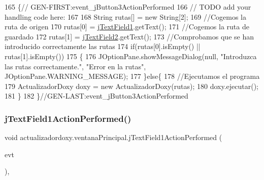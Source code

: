 \begin{DoxyCode}
165                                                                          \{\textcolor{comment}{//
      GEN-FIRST:event\_jButton3ActionPerformed}
166         \textcolor{comment}{// TODO add your handling code here:}
167         
168         String rutas[] = \textcolor{keyword}{new} String[2];
169         \textcolor{comment}{//Cogemos la ruta de origen}
170         rutas[0] = \mbox{\hyperlink{classactualizadordoxy_1_1ventana_principal_a0e2df794c32f58c41675cd579e38b5d0}{jTextField1}}.getText();
171         \textcolor{comment}{//Cogemos la ruta de guardado}
172         rutas[1] = \mbox{\hyperlink{classactualizadordoxy_1_1ventana_principal_a8e245eb8ef04c878fffa2f029094c142}{jTextField2}}.getText();
173         \textcolor{comment}{//Comprobamos que se han introducido correctamente las rutas}
174         \textcolor{keywordflow}{if}(rutas[0].isEmpty() || rutas[1].isEmpty())
175         \{
176             JOptionPane.showMessageDialog(null, \textcolor{stringliteral}{"Introduzca las rutas correctamente."}, \textcolor{stringliteral}{"Error en la rutas"},
       JOptionPane.WARNING\_MESSAGE);
177         \}\textcolor{keywordflow}{else}\{
178             \textcolor{comment}{//Ejecutamos el programa}
179             ActualizadorDoxy doxy = \textcolor{keyword}{new} ActualizadorDoxy(rutas);
180             doxy.ejecutar();
181         \}
182     \}\textcolor{comment}{//GEN-LAST:event\_jButton3ActionPerformed}
\end{DoxyCode}
\mbox{\label{classactualizadordoxy_1_1ventana_principal_a07a6f5c9a19788d19f2e92d3d4ae9942}} 
\subsubsection{\texorpdfstring{j\+Text\+Field1\+Action\+Performed()}{jTextField1ActionPerformed()}}
{\footnotesize\ttfamily void actualizadordoxy.\+ventana\+Principal.\+j\+Text\+Field1\+Action\+Performed (\begin{DoxyParamCaption}\item[{java.\+awt.\+event.\+Action\+Event}]{evt }\end{DoxyParamCaption})\hspace{0.3cm}{\ttfamily [inline]}, {\ttfamily [private]}}


